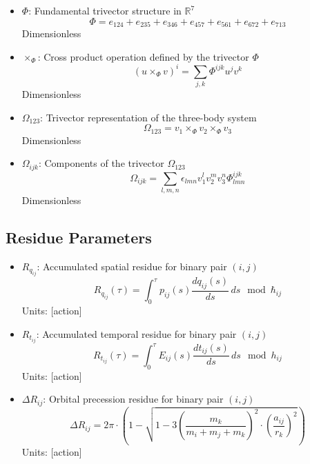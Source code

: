 \documentclass{article}
\begin{document}
\begin{itemize}
\item $\Phi$: Fundamental trivector structure in $\mathbb{R}^7$
    \begin{equation}
    \Phi = e_{124} + e_{235} + e_{346} + e_{457} + e_{561} + e_{672} + e_{713}
    \end{equation}
    Dimensionless
    
\item $\times_\Phi$: Cross product operation defined by the trivector $\Phi$
    \begin{equation}
    (u \times_\Phi v)^i = \sum_{j,k} \Phi^{ijk} u^j v^k
    \end{equation}
    Dimensionless
    
\item $\Omega_{123}$: Trivector representation of the three-body system
    \begin{equation}
    \Omega_{123} = v_1 \times_\Phi v_2 \times_\Phi v_3
    \end{equation}
    Dimensionless
    
\item $\Omega_{ijk}$: Components of the trivector $\Omega_{123}$
    \begin{equation}
    \Omega_{ijk} = \sum_{l,m,n} \epsilon_{lmn} v_1^l v_2^m v_3^n \Phi^{ijk}_{lmn}
    \end{equation}
    Dimensionless
\end{itemize}

\subsection{Residue Parameters}

\begin{itemize}
\item $R_{q_{ij}}$: Accumulated spatial residue for binary pair $(i,j)$
    \begin{equation}
    R_{q_{ij}}(\tau) = \int_0^\tau p_{ij}(s) \frac{dq_{ij}(s)}{ds} \, ds \mod \hbar_{ij}
    \end{equation}
    Units: [action]
    
\item $R_{t_{ij}}$: Accumulated temporal residue for binary pair $(i,j)$
    \begin{equation}
    R_{t_{ij}}(\tau) = \int_0^\tau E_{ij}(s) \frac{dt_{ij}(s)}{ds} \, ds \mod h_{ij}
    \end{equation}
    Units: [action]
    
\item $\Delta R_{ij}$: Orbital precession residue for binary pair $(i,j)$
    \begin{equation}
    \Delta R_{ij} = 2\pi \cdot (1 - \sqrt{1-3\left(\frac{m_k}{m_i+m_j+m_k}\right)^2 \cdot \left(\frac{a_{ij}}{r_k}\right)^2})
    \end{equation}
    Units: [action]
\end{itemize}
\end{document}
